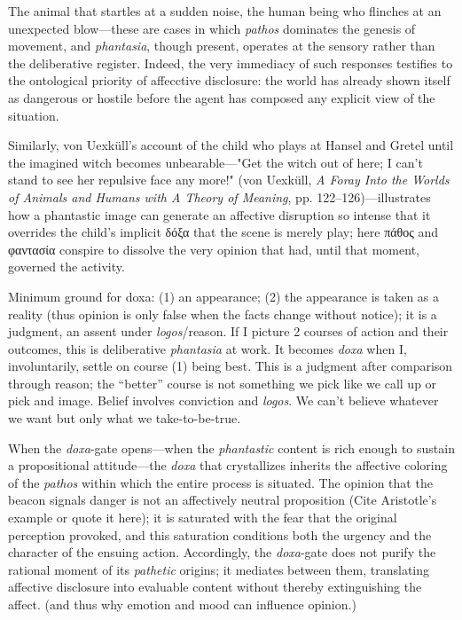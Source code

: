 \documentclass{article}
\newcommand{\gk}[1]{{\greekfont #1}}
\begin{document}
\begin{list}
    \item The animal that startles at a sudden noise, the human being who flinches at an unexpected blow---these are cases in which \textit{pathos} dominates the genesis of movement, and \textit{phantasia}, though present, operates at the sensory rather than the deliberative register. Indeed, the very immediacy of such responses testifies to the ontological priority of affecctive disclosure: the world has already shown itself as dangerous or hostile before the agent has composed any explicit view of the situation.

    \item Similarly, von Uexküll's account of the child who plays at Hansel and Gretel until the imagined witch becomes unbearable—"Get the witch out of here; I can't stand to see her repulsive face any more!" (von Uexküll, \textit{A Foray Into the Worlds of Animals and Humans with A Theory of Meaning}, pp. 122–126)—illustrates how a phantastic image can generate an affective disruption so intense that it overrides the child's implicit \gk{δόξα} that the scene is merely play; here \gk{πάθος} and \gk{φαντασία} conspire to dissolve the very opinion that had, until that moment, governed the activity.

    \item Minimum ground for doxa: (1) an appearance; (2) the appearance is taken as a reality (thus opinion is only false when the facts change without notice); it is a judgment, an assent under \textit{logos}/reason. If I picture 2 courses of action and their outcomes, this is deliberative \textit{phantasia} at work. It becomes \textit{doxa} when I, involuntarily, settle on course (1) being best. This is a judgment after comparison through reason; the ``better'' course is not something we pick like we call up or pick and image. Belief involves conviction and \textit{logos}. We can't believe whatever we want but only what we take-to-be-true. 

    \item When the \textit{doxa}-gate opens---when the \textit{phantastic} content is rich enough to sustain a propositional attitude---the \textit{doxa} that crystallizes inherits the affective coloring of the \textit{pathos} within which the entire process is situated. The opinion that the beacon signals danger is not an affectively neutral proposition (Cite Aristotle's example or quote it here); it is saturated with the fear that the original perception provoked, and this saturation conditions both the urgency and the character of the ensuing action. Accordingly, the \textit{doxa}-gate does not purify the rational moment of its \textit{pathetic} origins; it mediates between them, translating affective disclosure into evaluable content without thereby extinguishing the affect. (and thus why emotion and mood can influence opinion.)


\end{list}
\end{document}
